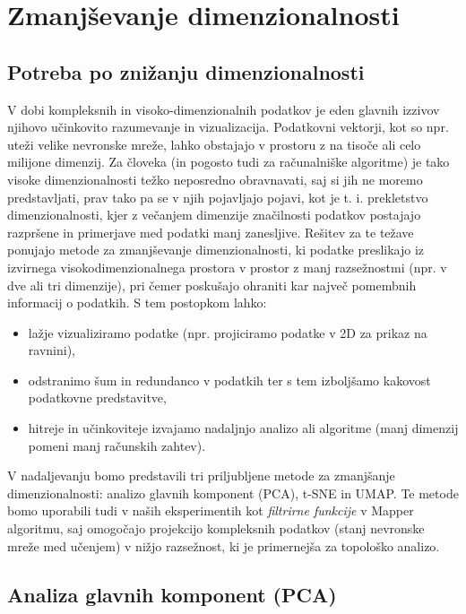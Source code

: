 \chapter{Zmanjševanje dimenzionalnosti} \section{Potreba po znižanju dimenzionalnosti}
V dobi kompleksnih in visoko-dimenzionalnih podatkov je eden glavnih izzivov njihovo učinkovito razumevanje in vizualizacija. Podatkovni vektorji, kot so npr. uteži velike nevronske mreže, lahko obstajajo v prostoru z na tisoče ali celo milijone dimenzij. Za človeka (in pogosto tudi za računalniške algoritme) je tako visoke dimenzionalnosti težko neposredno obravnavati, saj si jih ne moremo predstavljati, prav tako pa se v njih pojavljajo pojavi, kot je t. i. prekletstvo dimenzionalnosti, kjer z večanjem dimenzije značilnosti podatkov postajajo razpršene in primerjave med podatki manj zanesljive. Rešitev za te težave ponujajo metode za zmanjševanje dimenzionalnosti, ki podatke preslikajo iz izvirnega visokodimenzionalnega prostora v prostor z manj razsežnostmi (npr. v dve ali tri dimenzije), pri čemer poskušajo ohraniti kar največ pomembnih informacij o podatkih. S tem postopkom lahko:
\begin{itemize}
\item lažje vizualiziramo podatke (npr. projiciramo podatke v 2D za prikaz na ravnini),
\item odstranimo šum in redundanco v podatkih ter s tem izboljšamo kakovost podatkovne predstavitve,
\item hitreje in učinkoviteje izvajamo nadaljnjo analizo ali algoritme (manj dimenzij pomeni manj računskih zahtev).
\end{itemize}
V nadaljevanju bomo predstavili tri priljubljene metode za zmanjšanje dimenzionalnosti: analizo glavnih komponent (PCA), t-SNE in UMAP. Te metode bomo uporabili tudi v naših eksperimentih kot \textit{filtrirne funkcije} v Mapper algoritmu, saj omogočajo projekcijo kompleksnih podatkov (stanj nevronske mreže med učenjem) v nižjo razsežnost, ki je primernejša za topološko analizo. \section{Analiza glavnih komponent (PCA)}

